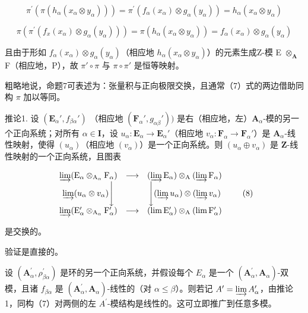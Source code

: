 \[
\pi^ {\prime} \left(\pi \left(h _ {\alpha} \left(x _ {\alpha} \otimes y _ {\alpha}\right)\right)\right) = \pi^ {\prime} \left(f _ {\alpha} \left(x _ {\alpha}\right) \otimes g _ {\alpha} \left(y _ {\alpha}\right)\right) = h _ {\alpha} \left(x _ {\alpha} \otimes y _ {\alpha}\right)
\]

\[
\pi (\pi^ {\prime} (f _ {x} (x _ {\alpha}) \otimes g _ {\alpha} (y _ {\alpha}))) = \pi (h _ {\alpha} (x _ {\alpha} \otimes y _ {\alpha})) = f _ {\alpha} (x _ {\alpha}) \otimes g _ {\alpha} (y _ {\alpha})
\]

且由于形如 \(f_{\alpha}(x_{\alpha}) \otimes g_{\alpha}(y_{\alpha})\)（相应地 \(h_{\alpha}(x_{\alpha} \otimes y_{\alpha})\)）的元素生成Z-模 E \(\otimes_{\mathbf{A}}\) F（相应地，P），故 \(\pi' \circ \pi\) 与 \(\pi \circ \pi'\) 是恒等映射。

粗略地说，命题7可表述为：张量积与正向极限交换，且通常（7）式的两边借助同构 \(\pi\) 加以等同。

推论1. 设 \((\mathbf{E}_{\alpha}', f_{\beta \alpha}')\) （相应地 \((\mathbf{F}_{\alpha}', g_{\alpha \beta}'))\) 是右（相应地，左）\(\mathbf{A}_{\alpha}\)-模的另一个正向系统；对所有 \(\alpha \in \mathbf{I}\)，设 \(u_{\alpha}: \mathbf{E}_{\alpha} \to \mathbf{E}_{\alpha}'\)（相应地 \(v_{\alpha}: \mathbf{F}_{\alpha} \to \mathbf{F}_{\alpha}'\)）是 \(\mathbf{A}_{\alpha}\)-线性映射，使得 \((u_{\alpha})\)（相应地 \((v_{\alpha})\)）是一个正向系统。则 \((u_{\alpha} \oplus v_{\alpha})\) 是 \(\mathbf{Z}\)-线性映射的一个正向系统，且图表

\[
\begin{array}{c c c} \varinjlim (\mathrm{E} _ {\alpha} \otimes_ {\mathrm{A} _ {\alpha}} \mathrm{F} _ {\alpha}) & \longrightarrow & (\varinjlim \mathrm{E} _ {\alpha}) \otimes_ {\mathrm{A}} (\varinjlim \mathrm{F} _ {\alpha}) \\ \varinjlim (u _ {\alpha} \otimes v _ {\alpha}) \Bigg \downarrow & & \Bigg \downarrow (\varinjlim u _ {\alpha}) \otimes (\varinjlim v _ {\alpha}) \\ \varinjlim (\mathrm{E} _ {\alpha} ^ {\prime} \otimes_ {\mathrm{A} _ {\alpha}} \mathrm{F} _ {\alpha} ^ {\prime}) & \longrightarrow & (\lim \mathrm{E} _ {\alpha} ^ {\prime}) \otimes_ {\mathrm{A}} (\lim \mathrm{F} _ {\alpha} ^ {\prime}) \end{array}\tag{8}
\]

是交换的。

验证是直接的。

设 \((\mathbf{A}_{\alpha}^{\prime}, \rho_{\beta\alpha}^{\prime})\) 是环的另一个正向系统，并假设每个 \(E_{\alpha}\) 是一个 \((\mathbf{A}_{\alpha}^{\prime}, \mathbf{A}_{\alpha})\)-双模，且诸 \(f_{\beta\alpha}\) 是 \((\mathbf{A}_{\alpha}^{\prime}, \mathbf{A}_{\alpha})\)-线性的（对 \(\alpha \leqslant \beta\)）。则若记 \(A^{\prime} = \varinjlim A_{\alpha}^{\prime}\)，由推论1，同构（7）对两侧的左 \(A^{\prime}\)-模结构是线性的。这可立即推广到任意多模。

